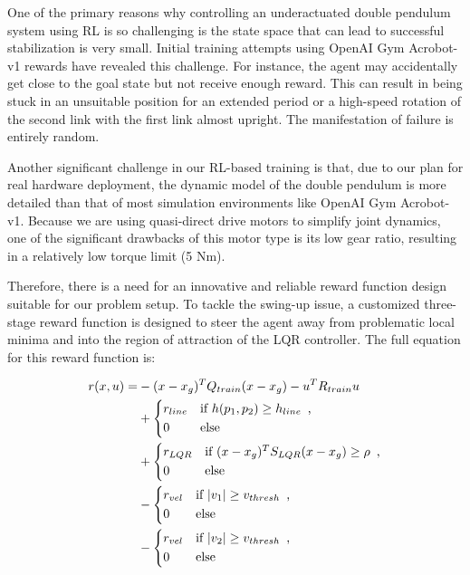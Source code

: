 One of the primary reasons why controlling an underactuated double pendulum system using RL is so challenging is the state space that can lead to successful stabilization is very small. Initial training attempts using OpenAI Gym Acrobot-v1\cite{towers_gymnasium_2023} rewards have revealed this challenge. For instance, the agent may accidentally get close to the goal state but not receive enough reward. This can result in being stuck in an unsuitable position for an extended period or a high-speed rotation of the second link with the first link almost upright. The manifestation of failure is entirely random.

Another significant challenge in our RL-based training is that, due to our plan for real hardware deployment, the dynamic model of the double pendulum is more detailed than that of most simulation environments like OpenAI Gym Acrobot-v1\cite{towers_gymnasium_2023}. Because we are using quasi-direct drive motors to simplify joint dynamics, one of the significant drawbacks of this motor type is its low gear ratio, resulting in a relatively low torque limit (5 Nm).

Therefore, there is a need for an innovative and reliable reward function design suitable for our problem setup. To tackle the swing-up issue, a customized three-stage reward function is designed to steer the agent away from problematic local minima and into the region of attraction of the LQR controller. The full equation for this reward function is:

\begin{equation}
\begin{aligned}
 r(x,u) = &-(x - x_g)^T Q_{train} (x - x_g) - u^T R_{train}u \\
           & +
            \begin{dcases*}
              r_{line} & \text{if} $h(p_1, p_2) \geq h_{line}$\, ,\\
              0 & \text{else}
            \end{dcases*}\\
           & +
            \begin{dcases*}
              r_{LQR} & \text{if} $(x - x_g)^T S_{LQR} (x - x_g) \geq \rho $\, ,\\
              0 & \text{else}
            \end{dcases*}\\
           & -
            \begin{dcases*}
              r_{vel} & \text{if} $|v_1| \geq v_{thresh}$\, ,\\
              0 & \text{else}
            \end{dcases*}\\
           & -
            \begin{dcases*}
              r_{vel} & \text{if} $|v_2| \geq v_{thresh}$\, ,\\
              0 & \text{else}
            \end{dcases*}
\end{aligned}
\end{equation}

